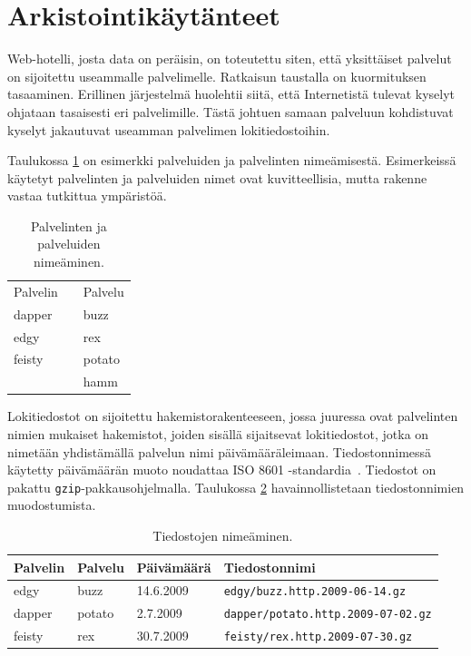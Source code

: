 \section{Arkistointikäytänteet}

Web-hotelli, josta data on peräisin, on toteutettu siten, että yksittäiset palvelut on
sijoitettu useammalle palvelimelle. Ratkaisun taustalla on
kuormituksen tasaaminen. Erillinen järjestelmä huolehtii siitä, että
Internetistä tulevat kyselyt ohjataan tasaisesti eri
palvelimille. Tästä johtuen samaan palveluun kohdistuvat kyselyt
jakautuvat useamman palvelimen lokitiedostoihin.

Taulukossa \ref{nimet} on esimerkki palveluiden ja palvelinten
nimeämisestä. Esimerkeissä käytetyt palvelinten ja palveluiden nimet
ovat kuvitteellisia, mutta rakenne vastaa tutkittua ympäristöä.

\begin{table}[h]
\centering
\begin{tabular}{lll}
Palvelin && Palvelu \\
\cline{1-1}\cline{3-3}
dapper && buzz \\
edgy && rex \\
feisty && potato \\
&& hamm \\
\end{tabular}
\caption{Palvelinten ja palveluiden nimeäminen.}
\label{nimet}
\end{table}

Lokitiedostot on sijoitettu hakemistorakenteeseen, jossa juuressa ovat
palvelinten nimien mukaiset hakemistot, joiden sisällä sijaitsevat
lokitiedostot, jotka on nimetään yhdistämällä palvelun nimi
päivämääräleimaan. Tiedostonnimessä käytetty päivämäärän muoto
noudattaa ISO 8601 -standardia~\cite{iso8601}. Tiedostot on pakattu
\texttt{gzip}-pakkausohjelmalla. Taulukossa \ref{tiedostot}
havainnollistetaan tiedostonnimien muodostumista.

\begin{table}[h]
\centering
\begin{tabular}{llll}
Palvelin & Palvelu & Päivämäärä & Tiedostonnimi \\
\hline
edgy & buzz & 14.6.2009 & \texttt{edgy/buzz.http.2009-06-14.gz}\\ 
dapper & potato & 2.7.2009 & \texttt{dapper/potato.http.2009-07-02.gz}\\
feisty & rex & 30.7.2009 & \texttt{feisty/rex.http.2009-07-30.gz}\\
\end{tabular}
\caption{Tiedostojen nimeäminen.}
\label{tiedostot}
\end{table}

